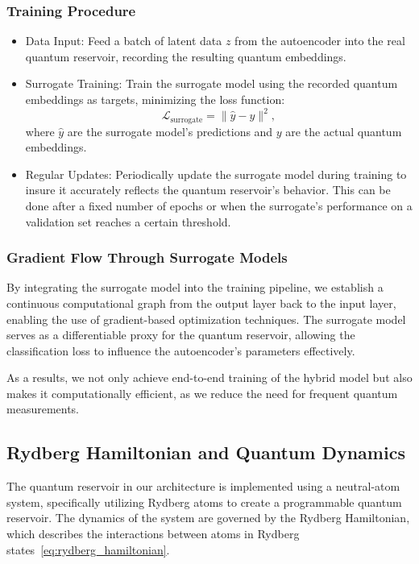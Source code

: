 \documentclass[conference]{IEEEtran}
\begin{document}
\subsubsection{Training Procedure}
\begin{itemize}
    \item Data Input: 
    Feed a batch of latent data \( z \) from the autoencoder 
    into the real quantum reservoir, recording the resulting quantum 
    embeddings.

    \item Surrogate Training:
    Train the surrogate model using the recorded quantum
    embeddings as targets, minimizing the loss function:
    \begin{equation}
        \mathcal{L}_{\text{surrogate}} = \| \hat{y} - y \|^2,
    \end{equation}
    where \( \hat{y} \) are the surrogate model's predictions
    and \( y \) are the actual quantum embeddings.

    \item Regular Updates:
    Periodically update the surrogate model during training
    to insure it accurately reflects the quantum reservoir's
    behavior. This can be done after a fixed number of epochs
    or when the surrogate's performance on a validation set
    reaches a certain threshold.
\end{itemize}

\subsubsection{Gradient Flow Through Surrogate Models}
By integrating the surrogate model into the training pipeline, 
we establish a continuous computational graph from the 
output layer back to the input layer, enabling the use of 
gradient-based optimization techniques. The surrogate model 
serves as a differentiable proxy for the quantum reservoir, 
allowing the classification loss to influence the 
autoencoder's parameters effectively.

As a results, we not only achieve end-to-end training of the
hybrid model but also makes it computationally efficient,
as we reduce the need for frequent quantum measurements.

\subsection{Rydberg Hamiltonian and Quantum Dynamics}
The quantum reservoir in our architecture is implemented
using a neutral-atom system, specifically utilizing
Rydberg atoms to create a programmable quantum reservoir.
The dynamics of the system are governed by the Rydberg Hamiltonian,
which describes the interactions between atoms in Rydberg states~\ref{eq:rydberg_hamiltonian}.
\end{document}
